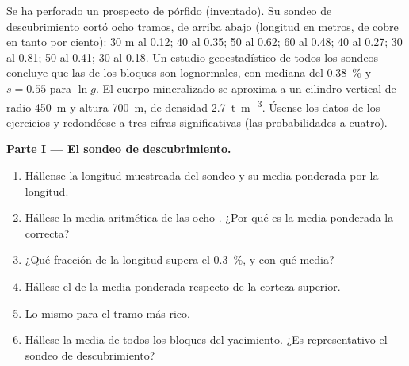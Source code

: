 \begin{problem}\label{pb:b2:ore-deposits:1}
Se ha perforado un prospecto de pórfido (inventado). Su sondeo de descubrimiento cortó ocho tramos, de arriba
abajo (longitud en metros,  de cobre en tanto por ciento): 30 m al 0.12; 40 al 0.35; 50 al 0.62; 60
al 0.48; 40 al 0.27; 30 al 0.81; 50 al 0.41; 30 al 0.18. Un estudio geoestadístico de todos los sondeos
concluye que las  de los bloques son lognormales, con mediana del \qty{0.38}{\percent} y $s = 0.55$ para
$\ln g$. El cuerpo mineralizado se aproxima a un cilindro vertical de radio \qty{450}{m} y altura
\qty{700}{m}, de densidad \qty{2.7}{t.m^{-3}}. Úsense los datos de los ejercicios y redondéese a tres
cifras significativas (las probabilidades a cuatro).

\noindent\textbf{Parte I --- El sondeo de descubrimiento.}
\begin{enumerate}
  \item Hállense la longitud muestreada del sondeo y su  media ponderada por la longitud.
  \item Hállese la media aritmética de las ocho . ¿Por qué es la media ponderada la correcta?
  \item ¿Qué fracción de la longitud supera el \qty{0.3}{\percent}, y con qué  media?
  \item Hállese el  de la  media ponderada respecto de la corteza superior.
  \item Lo mismo para el tramo más rico.
  \item Hállese la  media de todos los bloques del yacimiento. ¿Es representativo el sondeo de descubrimiento?
\end{enumerate}


\end{problem}
